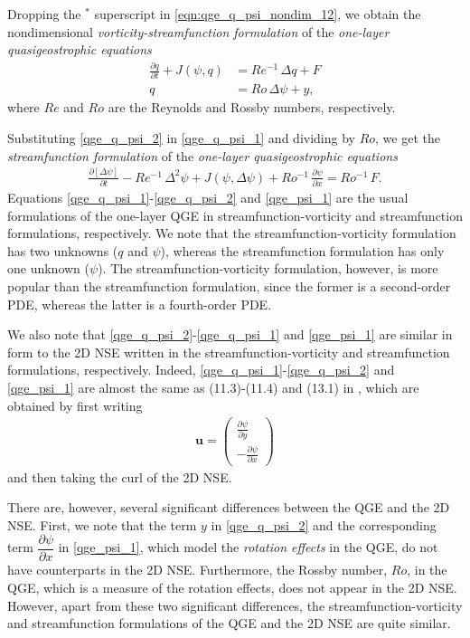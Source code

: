 Dropping the $^*$ superscript in \eqref{eqn:qge_q_psi_nondim_12}, we obtain the nondimensional {\it
vorticity-streamfunction formulation} of the \emph{one-layer quasigeostrophic equations}
\begin{align}
  \frac{\partial q}{\partial t} + J(\psi , q) &= Re^{-1} \, \Delta q + F \label{qge_q_psi_1} \\
  q &= Ro \, \Delta \psi + y, \label{qge_q_psi_2}
\end{align}
where $Re$ and $Ro$ are the Reynolds and Rossby numbers, respectively.

Substituting \eqref{qge_q_psi_2} in \eqref{qge_q_psi_1} and dividing by $Ro$, we get the {\it
streamfunction formulation} of the \emph{one-layer quasigeostrophic equations}
\begin{align}
  \frac{\partial \left[ \Delta \psi \right]}{\partial t} - Re^{-1} \, \Delta^2 \psi + J(\psi
    , \Delta \psi) + Ro^{-1} \, \frac{\partial \psi}{\partial x} = Ro^{-1} \, F. \label{qge_psi_1}
\end{align}
Equations \eqref{qge_q_psi_1}-\eqref{qge_q_psi_2} and \eqref{qge_psi_1} are the usual formulations
of the one-layer QGE in streamfunction-vorticity and streamfunction formulations, respectively. We
note that the streamfunction-vorticity formulation has two unknowns ($q$ and $\psi$), whereas the
streamfunction formulation has only one unknown ($\psi$). The streamfunction-vorticity formulation,
however, is more popular than the streamfunction formulation, since the former is a second-order
PDE, whereas the latter is a fourth-order PDE.

We also note that \eqref{qge_q_psi_2}-\eqref{qge_q_psi_1} and \eqref{qge_psi_1} are similar in form
to the 2D NSE written in the streamfunction-vorticity and streamfunction formulations, respectively.
Indeed, \eqref{qge_q_psi_1}-\eqref{qge_q_psi_2} and \eqref{qge_psi_1} are almost the same as
(11.3)-(11.4) and (13.1) in \cite{Gunzburger89}, which are obtained by first writing 
\begin{align}
  \mathbf{u} = \begin{pmatrix} \frac{\partial \psi}{\partial y} \\[0.2cm]
      - \frac{\partial \psi}{\partial x}
    \end{pmatrix} \label{qge_psi_2}
\end{align}
and then taking the curl of the 2D NSE.

There are, however, several significant differences between the QGE and the 2D NSE. First, we note
that the term $y$ in \eqref{qge_q_psi_2} and the corresponding term $\dfrac{\partial \psi}{\partial
x}$ in \eqref{qge_psi_1}, which model the \emph{rotation effects} in the QGE, do not have
counterparts in the 2D NSE.  Furthermore, the Rossby number, $Ro$, in the QGE, which is a measure of
the rotation effects, does not appear in the 2D NSE.  However, apart from these two significant
differences, the streamfunction-vorticity and streamfunction formulations of the QGE and the 2D NSE
are quite similar.

